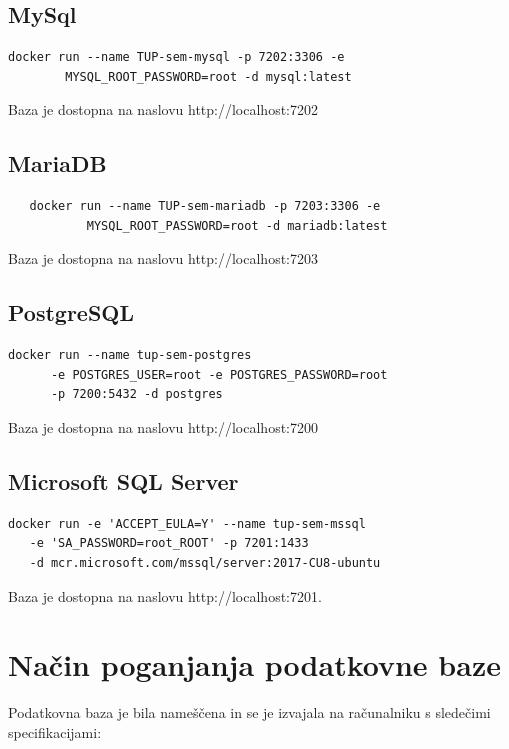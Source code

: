 \documentclass[a4paper,11pt]{report}
\begin{document}
\subsection{MySql}
\begin{lstlisting}
docker run --name TUP-sem-mysql -p 7202:3306 -e 
        MYSQL_ROOT_PASSWORD=root -d mysql:latest
\end{lstlisting}

Baza je dostopna na naslovu http://localhost:7202

\subsection{MariaDB}
\begin{lstlisting}
   docker run --name TUP-sem-mariadb -p 7203:3306 -e 
           MYSQL_ROOT_PASSWORD=root -d mariadb:latest
   \end{lstlisting}
   
   Baza je dostopna na naslovu http://localhost:7203

\subsection{PostgreSQL}
\begin{lstlisting}
docker run --name tup-sem-postgres 
      -e POSTGRES_USER=root -e POSTGRES_PASSWORD=root 
      -p 7200:5432 -d postgres
\end{lstlisting}
   
Baza je dostopna na naslovu http://localhost:7200

\subsection{Microsoft SQL Server}
\begin{lstlisting}
docker run -e 'ACCEPT_EULA=Y' --name tup-sem-mssql 
   -e 'SA_PASSWORD=root_ROOT' -p 7201:1433 
   -d mcr.microsoft.com/mssql/server:2017-CU8-ubuntu
\end{lstlisting}
   
Baza je dostopna na naslovu http://localhost:7201.



\section{Način poganjanja podatkovne baze}
Podatkovna baza je bila nameščena in se je izvajala na računalniku s sledečimi specifikacijami:
\end{document}
